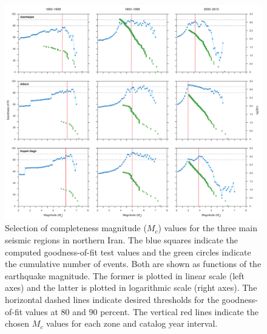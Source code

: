 \begin{figure}[t]
    \centering
    \includegraphics[width=\textwidth]{figures/pdf/figure-06.pdf}
    \caption{Selection of completeness magnitude ($M_c$) values for the three main seismic regions in northern Iran. The blue squares indicate the computed goodness-of-fit test values and the green circles indicate the cumulative number of events. Both are shown as functions of the earthquake magnitude. The former is plotted in linear scale (left axes) and the latter is plotted in logarithmic scale (right axes). The horizontal dashed lines indicate desired thresholds for the goodness-of-fit values at 80 and 90 percent. The vertical red lines indicate the chosen $M_c$ values for each zone and catalog year interval.}
    \label{fig:mc}
\end{figure}

